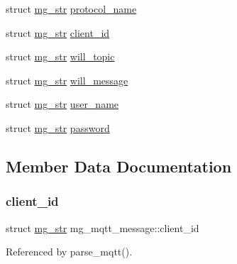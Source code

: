 \begin{DoxyCompactItemize}
struct \hyperlink{structmg__str}{mg\+\_\+str} \hyperlink{structmg__mqtt__message_ae908f614c1a210234df403fe9148d229_ae908f614c1a210234df403fe9148d229}{protocol\+\_\+name}
\item 
struct \hyperlink{structmg__str}{mg\+\_\+str} \hyperlink{structmg__mqtt__message_aa737e24d88a034c481cffdd207c6cb1a_aa737e24d88a034c481cffdd207c6cb1a}{client\+\_\+id}
\item 
struct \hyperlink{structmg__str}{mg\+\_\+str} \hyperlink{structmg__mqtt__message_a445cb051eb2301102a74561590614322_a445cb051eb2301102a74561590614322}{will\+\_\+topic}
\item 
struct \hyperlink{structmg__str}{mg\+\_\+str} \hyperlink{structmg__mqtt__message_abf358db60e5a092bd71a52a2dc9d02c7_abf358db60e5a092bd71a52a2dc9d02c7}{will\+\_\+message}
\item 
struct \hyperlink{structmg__str}{mg\+\_\+str} \hyperlink{structmg__mqtt__message_a85ab9fb52ea0d8f353dcc09e285516c7_a85ab9fb52ea0d8f353dcc09e285516c7}{user\+\_\+name}
\item 
struct \hyperlink{structmg__str}{mg\+\_\+str} \hyperlink{structmg__mqtt__message_a9b8cee8acf7b16eed78f29b08d792229_a9b8cee8acf7b16eed78f29b08d792229}{password}
\end{DoxyCompactItemize}


\subsection{Member Data Documentation}
\mbox{\label{structmg__mqtt__message_aa737e24d88a034c481cffdd207c6cb1a_aa737e24d88a034c481cffdd207c6cb1a}} 
\subsubsection{\texorpdfstring{client\+\_\+id}{client\_id}}
{\footnotesize\ttfamily struct \hyperlink{structmg__str}{mg\+\_\+str} mg\+\_\+mqtt\+\_\+message\+::client\+\_\+id}



Referenced by parse\+\_\+mqtt().

\mbox{\label{structmg__mqtt__message_abfc247fa4aaf411b0957e71df6f6ce2b_abfc247fa4aaf411b0957e71df6f6ce2b}} 
